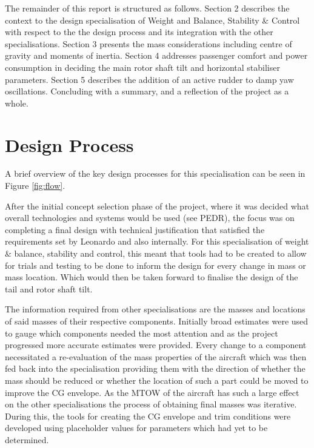 \documentclass[11pt,a4paper]{article}
\begin{document}
The remainder of this report is structured as follows. Section 2 describes the context to the design specialisation of Weight and Balance, Stability \& Control with respect to the the design process and its integration with the other specialisations. Section 3 presents the mass considerations including centre of gravity and moments of inertia. Section 4 addresses passenger comfort and power consumption in deciding the main rotor shaft tilt and horizontal stabiliser parameters. Section 5 describes the addition of an active rudder to damp yaw oscillations. Concluding with a summary, and a reflection of the project as a whole.
\section{Design Process}
A brief overview of the key design processes for this specialisation can be seen in  Figure \ref{fig:flow}.

After the initial concept selection phase of the project, where it was decided what overall technologies and systems would be used (see PEDR), the focus was on completing a final design with technical justification that satisfied the requirements set by Leonardo and also internally. For this specialisation of weight \& balance, stability and control, this meant that tools had to be created to allow for trials and testing to be done to inform the design for every change in mass or mass location. Which would then be taken forward to finalise the design of the tail and rotor shaft tilt.

The information required from other specialisations are the masses and locations of said masses of their respective components. Initially broad estimates were used to gauge which components needed the most attention and as the project progressed more accurate estimates were provided. Every change to a component necessitated a re-evaluation of the mass properties of the aircraft which was then fed back into the specialisation providing them with the direction of whether the mass should be reduced or whether the location of such a part could be moved to improve the CG envelope. As the MTOW of the aircraft has such a large effect on the other specialisations the process of obtaining final masses was iterative. During this, the tools for creating the  CG envelope and trim conditions were developed using placeholder values for parameters which had yet to be determined.
\end{document}
